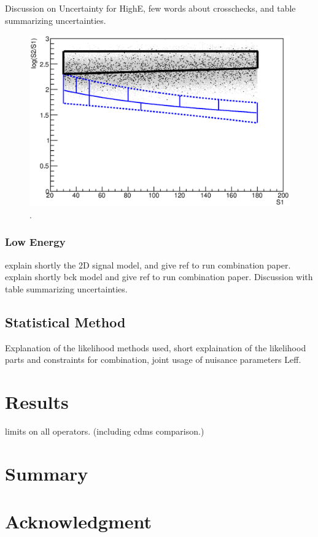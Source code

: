 \documentclass[twocolumn, showpacs, showkeys, amsmath, amssymb, floatfix]{revtex4}
\begin{document}
Discussion on Uncertainty for HighE, few words about crosschecks, and table summarizing uncertainties.

\begin{figure}[h!]
\begin{minipage}{1.\linewidth}
\centerline{\includegraphics[width=1.\linewidth]{Figures/phasespace.eps}}
\end{minipage}
\caption{.}
\label{fig:Acc}
\end{figure}  


\subsubsection{Low Energy}
explain shortly the 2D signal model, and give ref to run combination paper.
explain shortly bck model and give ref to run combination paper. Discussion with table
summarizing uncertainties.


\subsection{Statistical Method}
Explanation of the likelihood methods used, short explaination of the likelihood parts and constraints for combination, joint usage of nuisance parameters {Leff}.


\section{Results}

limits on all operators. (including cdms comparison.)

\section{Summary}
\section{Acknowledgment}





\end{document}

